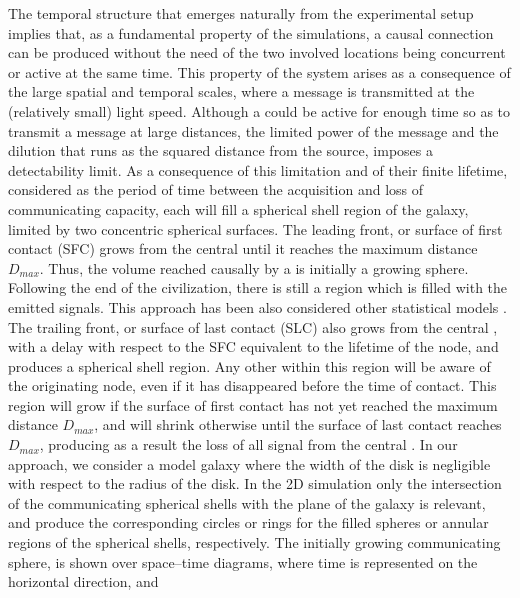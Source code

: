  


The temporal structure that emerges naturally from the experimental
setup implies that,
as a fundamental property of the simulations,
a causal connection can be produced without the need of the two
involved locations being concurrent or active at the same time.
%
This property of the system arises as a
consequence of the large spatial and temporal scales, where a message
is transmitted at the (relatively small) light speed.
%
Although a \ceti{} could be active for enough time so as to transmit a
message at large distances, the limited power of the message and the
dilution that runs as the squared distance from the source, imposes a
detectability limit.
%
As a consequence of this limitation and of their finite lifetime,
considered as the period of time between the acquisition and loss of
communicating capacity, each \ceti{} will fill a spherical shell
region of the galaxy, limited by two concentric spherical surfaces.
%
The leading front, or surface of first contact (SFC) grows from the
central \ceti{} until it reaches the maximum distance $D_{max}$.
%
Thus, the volume reached causally by a \ceti{} is initially a growing
sphere.
%
Following the end of the civilization, there is still a region which
is filled with the emitted signals.
%
This approach has been also considered other statistical models
\citep[e.g., ][]{smith_broadcasting_2009, grimaldi_signal_2017, Grimaldi2018}.
%
The trailing front, or surface of last contact (SLC) also grows from
the central \ceti{}, with a delay with respect to the SFC equivalent
to the lifetime of the node, and produces a spherical shell region.
%
Any other \ceti{} within this region will be aware of the originating
node, even if it has disappeared before the time of contact.
%
This region will grow if the surface of first contact has not yet
reached the maximum distance $D_{max}$, and will shrink otherwise
until the surface of last contact reaches $D_{max}$, producing as a
result the loss of all signal from the central \ceti{}.
%
In our approach, we consider a model galaxy where the width of the
disk is negligible with respect to the radius of the disk.
%
In the 2D simulation only the intersection of the communicating
spherical shells with the plane of the galaxy is relevant, and produce
the corresponding circles or rings for the filled spheres or annular
regions of the spherical shells, respectively.
%
The initially growing communicating sphere, is shown over space--time
diagrams, where time is represented on the horizontal direction, and
